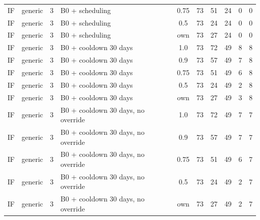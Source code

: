 \begin{longtable}{lllp{4.4cm}cccccc}
IF & generic & 3 & B0 + scheduling & 0.75 & 73 & 51 & 24 & 0 & 0 \\
IF & generic & 3 & B0 + scheduling & 0.5 & 73 & 24 & 24 & 0 & 0 \\
IF & generic & 3 & B0 + scheduling & own & 73 & 27 & 24 & 0 & 0 \\
IF & generic & 3 & B0 + cooldown 30 days & 1.0 & 73 & 72 & 49 & 8 & 8 \\
IF & generic & 3 & B0 + cooldown 30 days & 0.9 & 73 & 57 & 49 & 7 & 8 \\
IF & generic & 3 & B0 + cooldown 30 days & 0.75 & 73 & 51 & 49 & 6 & 8 \\
IF & generic & 3 & B0 + cooldown 30 days & 0.5 & 73 & 24 & 49 & 2 & 8 \\
IF & generic & 3 & B0 + cooldown 30 days & own & 73 & 27 & 49 & 3 & 8 \\
IF & generic & 3 & B0 + cooldown 30 days, no override & 1.0 & 73 & 72 & 49 & 7 & 7 \\
IF & generic & 3 & B0 + cooldown 30 days, no override & 0.9 & 73 & 57 & 49 & 7 & 7 \\
IF & generic & 3 & B0 + cooldown 30 days, no override & 0.75 & 73 & 51 & 49 & 6 & 7 \\
IF & generic & 3 & B0 + cooldown 30 days, no override & 0.5 & 73 & 24 & 49 & 2 & 7 \\
IF & generic & 3 & B0 + cooldown 30 days, no override & own & 73 & 27 & 49 & 2 & 7 \\
\bottomrule
\end{longtable}
